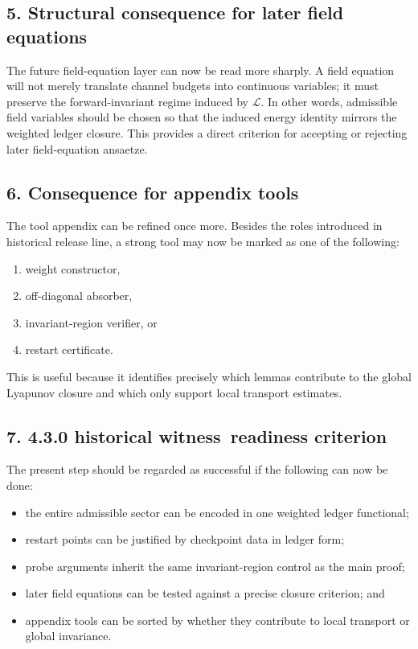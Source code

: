 \documentclass[12pt,a4paper]{article}
\DeclareRobustCommand{\QSCver}[1]{archival stage}
\newcommand{\docversion}{4.3.0 historical witness}
\renewcommand{\QSCver}[1]{historical release line}
\begin{document}
\subsection*{5. Structural consequence for later field equations}
The future field-equation layer can now be read more sharply. A field equation will
not merely translate channel budgets into continuous variables; it must preserve the
forward-invariant regime induced by $\mathcal L$. In other words, admissible field
variables should be chosen so that the induced energy identity mirrors the weighted
ledger closure. This provides a direct criterion for accepting or rejecting later
field-equation ansaetze.

\subsection*{6. Consequence for appendix tools}
The tool appendix can be refined once more. Besides the roles introduced in \QSCver{v2.5.0},
a strong tool may now be marked as one of the following:
\begin{enumerate}[label=(\alph*)]
 \item weight constructor,
 \item off-diagonal absorber,
 \item invariant-region verifier, or
 \item restart certificate.
\end{enumerate}
This is useful because it identifies precisely which lemmas contribute to the global
Lyapunov closure and which only support local transport estimates.

\subsection*{7. \docversion\ readiness criterion}
The present step should be regarded as successful if the following can now be done:
\begin{itemize}
 \item the entire admissible sector can be encoded in one weighted ledger functional;
 \item restart points can be justified by checkpoint data in ledger form;
 \item probe arguments inherit the same invariant-region control as the main proof;
 \item later field equations can be tested against a precise closure criterion; and
 \item appendix tools can be sorted by whether they contribute to local transport or global invariance.
\end{itemize}
\end{document}
